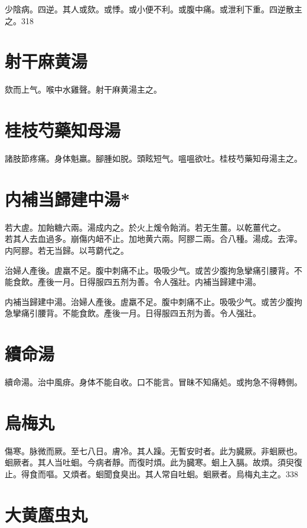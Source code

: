 少陰病。四逆。其人或欬。或悸。或小便不利。或腹中痛。或泄利下重。四逆散主之。318

\section{射干麻黄湯}

欬而上气。喉中水雞聲。射干麻黄湯主之。

\section{桂枝芍藥知母湯}

諸肢節疼痛。身体魁羸。腳腫如脱。頭眩短气。嗢嗢欲吐。桂枝芍藥知母湯主之。

\section{内補当歸建中湯*}

若大虗。加飴糖六兩。湯成内之。於火上煖令飴消。若无生薑。以乾薑代之。\\
若其人去血過多。崩傷内衄不止。加地黄六兩。阿膠二兩。合八種。湯成。去滓。内阿膠。若无当歸。以芎藭代之。

治婦人產後。虗羸不足。腹中刺痛不止。吸吸少气。或苦少腹拘急攣痛引腰背。不能食飲。產後一月。日得服四五剂为善。令人强壯。内補当歸建中湯。{\wuben}

内補当歸建中湯。治婦人產後。虗羸不足。腹中刺痛不止。吸吸少气。或苦少腹拘急攣痛引腰背。不能食飲。產後一月。日得服四五剂为善。令人强壯。{\dengben}

\section{續命湯}

續命湯。治中風痱。身体不能自收。口不能言。冒昧不知痛処。或拘急不得轉側。

\section{烏梅丸}



傷寒。脉微而厥。至七八日。膚冷。其人躁。无暫安时者。此为臓厥。非蛔厥也。蛔厥者。其人当吐蛔。今病者靜。而復时煩。此为臓寒。蛔上入膈。故煩。須臾復止。得食而嘔。又煩者。蛔聞食臭出。其人常自吐蛔。蛔厥者。烏梅丸主之。338

\section{大黄䗪虫丸}

